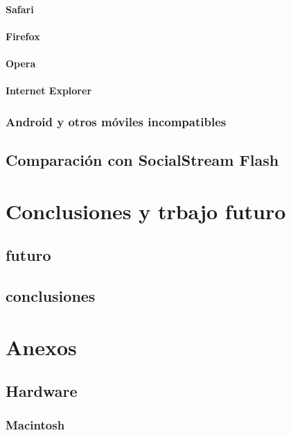 		\subsubsection{Safari}
		\subsubsection{Firefox}
		\subsubsection{Opera}
		\subsubsection{Internet Explorer}
	\subsection{Android y otros móviles incompatibles}
\section{Comparación con SocialStream Flash}

\chapter{Conclusiones y trbajo futuro}
	\section{futuro}
	\section{conclusiones}
	
	
\chapter{Anexos}
	\section{Hardware}
		\subsection{Macintosh}
